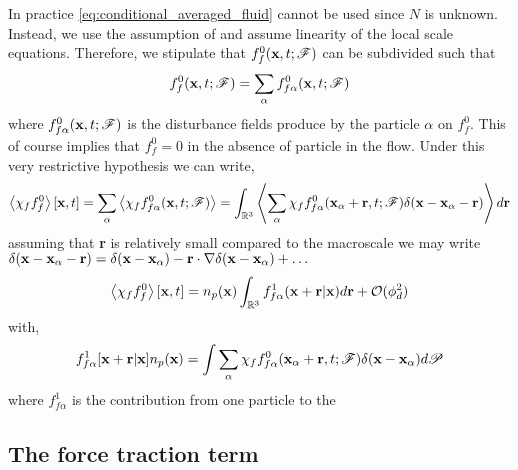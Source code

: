 In practice \ref{eq:conditional_averaged_fluid} cannot be used since $N$ is unknown. 
Instead, we use the assumption of \citet{batchelor1972sedimentation} and assume linearity of the local scale equations. 
Therefore, we stipulate that $f_f^0(\textbf{x},t;\mathscr{F})$ can be subdivided such that  
\begin{equation}
    f_f^0(\textbf{x},t;\mathscr{F})
    = 
    \sum_\alpha
    f_{f\alpha}^0(\textbf{x},t;\mathscr{F})
\end{equation}
where $f_{f\alpha}^0(\textbf{x},t;\mathscr{F})$ is the disturbance fields produce by the particle $\alpha$ on $f_f^0$. 
This of course implies that $f_f^0 = 0$ in the absence of particle in the flow. 
Under this very restrictive hypothesis we can write, 
\begin{equation}
    \left<\chi_ff_f^0\right>[\textbf{x},t]
    = 
    \sum_\alpha
    \left<\chi_f f_{f\alpha}^0(\textbf{x},t;\mathscr{F})\right>
    = 
    \int_{\mathbb{R}^3} 
    \left<
        \sum_\alpha
    \chi_f f_{f\alpha}^0(\textbf{x}_\alpha + \textbf{r},t;\mathscr{F}) \delta(\textbf{x} - \textbf{x}_\alpha - \textbf{r})\right>d\textbf{r}
\end{equation}
assuming that \textbf{r} is relatively small compared to the macroscale we may write $\delta(\textbf{x} - \textbf{x}_\alpha - \textbf{r}) =\delta(\textbf{x} - \textbf{x}_\alpha) - \textbf{r}\cdot \mathbf{\nabla}\delta(\textbf{x} - \textbf{x}_\alpha)+ \ldots$
\begin{equation}
    \left<\chi_ff_f^0\right>[\textbf{x},t]
    = 
    n_p(\textbf{x}) 
    \int_{\mathbb{R}^3} 
    f_{f\alpha}^1(\textbf{x}+ \textbf{r}| \textbf{x})
    d\textbf{r}
    + \mathcal{O}(\phi_d^2)
\end{equation}
with, 
\begin{equation*}
    f_{f\alpha}^1[\textbf{x}+ \textbf{r}| \textbf{x}]n_p(\textbf{x}) 
    = 
    \int{
    \sum_\alpha
    \chi_f f_{f\alpha}^0(\textbf{x}_\alpha + \textbf{r},t;\mathscr{F}) \delta(\textbf{x} - \textbf{x}_\alpha)
    }d\mathscr{P}
\end{equation*}
where $f_{f\alpha}^1$ is the contribution from one particle to the 

\subsection{The force traction term}

